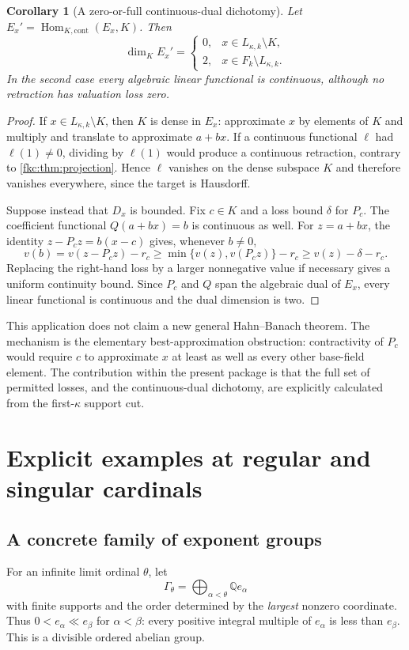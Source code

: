 \documentclass[11pt,letterpaper]{article}
\numberwithin{equation}{section}
\newtheorem{corollary}[theorem]{Corollary}
\theoremstyle{definition}
\theoremstyle{remark}
\newcommand{\Q}{\mathbb Q}
\begin{document}
\begin{corollary}[A zero-or-full continuous-dual dichotomy]\label{fkc:cor:dual}
Let $E_x'=\operatorname{Hom}_{K,\mathrm{cont}}(E_x,K)$. Then
\[
 \dim_K E_x'=
 \begin{cases}
 0,&x\in L_{\kappa,k}\setminus K,\\
 2,&x\in F_k\setminus L_{\kappa,k}.
 \end{cases}
\]
In the second case every algebraic linear functional is continuous, although no retraction has valuation loss zero.
\end{corollary}
\begin{proof}
If $x\in L_{\kappa,k}\setminus K$, then $K$ is dense in $E_x$: approximate $x$ by elements of $K$ and multiply and translate to approximate $a+bx$. If a continuous functional $\ell$ had $\ell(1)\ne0$, dividing by $\ell(1)$ would produce a continuous retraction, contrary to \cref{fkc:thm:projection}. Hence $\ell$ vanishes on the dense subspace $K$ and therefore vanishes everywhere, since the target is Hausdorff.

Suppose instead that $D_x$ is bounded. Fix $c\in K$ and a loss bound $\delta$ for $P_c$. The coefficient functional $Q(a+bx)=b$ is continuous as well. For $z=a+bx$, the identity $z-P_cz=b(x-c)$ gives, whenever $b\ne0$,
\[
 v(b)=v(z-P_cz)-r_c
 \ge\min\{v(z),v(P_cz)\}-r_c
 \ge v(z)-\delta-r_c.
\]
Replacing the right-hand loss by a larger nonnegative value if necessary gives a uniform continuity bound. Since $P_c$ and $Q$ span the algebraic dual of $E_x$, every linear functional is continuous and the dual dimension is two.
\end{proof}

This application does not claim a new general Hahn--Banach theorem. The mechanism is the elementary best-approximation obstruction: contractivity of $P_c$ would require $c$ to approximate $x$ at least as well as every other base-field element. The contribution within the present package is that the full set of permitted losses, and the continuous-dual dichotomy, are explicitly calculated from the first-$\kappa$ support cut.

\section{Explicit examples at regular and singular cardinals}
\label{fkc:sec:examples}

\subsection{A concrete family of exponent groups}
For an infinite limit ordinal $\theta$, let
\begin{equation}\label{fkc:eq:Gtheta}
 \Gamma_\theta=\bigoplus_{\alpha<\theta}\Q e_\alpha
\end{equation}
with finite supports and the order determined by the \emph{largest} nonzero coordinate. Thus $0<e_\alpha\ll e_\beta$ for $\alpha<\beta$: every positive integral multiple of $e_\alpha$ is less than $e_\beta$. This is a divisible ordered abelian group.
\end{document}
